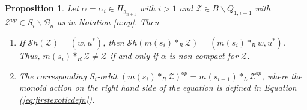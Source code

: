 \documentclass[12pt]{amsart}
\numberwithin{equation}{section}
\newtheorem{prop}[thm]{Proposition}
\newcommand{\cZ}{{\mathcal Z}}
\newcommand{\fg}{\mbox{${\mathfrak g}$}}
\newcommand{\B}{\mathcal{B}}
\newcommand{\Sh}{\mathcal{S}h}
\begin{document}
  \begin{prop}\label{p:unstablecorrespondence}
 Let $\alpha=\alpha_{i}\in\Pi_{\fg_{n+1}}$ with $i>1$ and $\cZ\in B\backslash Q_{1,i+1}$ with $\cZ^{op}\in S_{i}\backslash\B_{n}$ as in Notation \ref{n:op}.
 Then 
 \begin{enumerate}
 \item If $\Sh(\cZ)=(w,u^{*})$, then $\Sh(m(s_{i})*_{R}\cZ)=(m(s_{i})*_{R} w, u^{*})$.  Thus, $m(s_{i})*_{R}\cZ\neq \cZ$ if and only if $\alpha$ is non-compact for $\cZ$.  
 \item The corresponding $S_{i}$-orbit $(m(s_{i})*_{R}\cZ)^{op}=m(s_{i-1})*_{L}\cZ^{op}$, where the monoid action on the right hand side of the equation is defined in Equation (\ref{eq:firstexoticdefn}).
 \end{enumerate}
 \end{prop}
\end{document}
